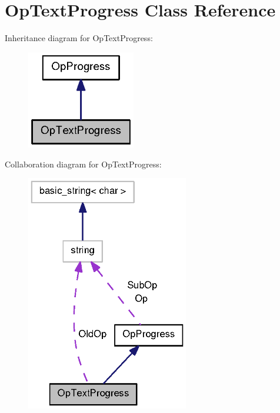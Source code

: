 \section{\-Op\-Text\-Progress \-Class \-Reference}
\label{classOpTextProgress}


\-Inheritance diagram for \-Op\-Text\-Progress\-:
\nopagebreak
\begin{figure}[H]
\begin{center}
\leavevmode
\includegraphics[width=134pt]{classOpTextProgress__inherit__graph}
\end{center}
\end{figure}


\-Collaboration diagram for \-Op\-Text\-Progress\-:
\nopagebreak
\begin{figure}[H]
\begin{center}
\leavevmode
\includegraphics[width=201pt]{classOpTextProgress__coll__graph}
\end{center}
\end{figure}
